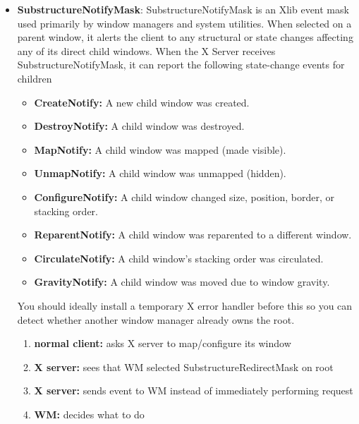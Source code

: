 \documentclass{report}
\begin{document}
\begin{itemize}
        \bigbreak \noindent 
        When this mask is set on a parent window (like the root window), it intercepts requests from other clients to map, configure (resize/move), or circulate child windows. Instead of executing the command, the X server pauses the action and sends the window manager a specific request even
    \item \textbf{SubstructureNotifyMask}: SubstructureNotifyMask is an Xlib event mask used primarily by window managers and system utilities. When selected on a parent window, it alerts the client to any structural or state changes affecting any of its direct child windows. 
        \bigbreak \noindent 
         When the X Server receives SubstructureNotifyMask, it can report the following state-change events for children
        \begin{itemize}
            \item \textbf{CreateNotify:} A new child window was created.
            \item \textbf{DestroyNotify:} A child window was destroyed.
            \item \textbf{MapNotify:} A child window was mapped (made visible).
            \item \textbf{UnmapNotify:} A child window was unmapped (hidden).
            \item \textbf{ConfigureNotify:} A child window changed size, position, border, or stacking order.
            \item \textbf{ReparentNotify:} A child window was reparented to a different window.
            \item \textbf{CirculateNotify:} A child window's stacking order was circulated.
            \item \textbf{GravityNotify:} A child window was moved due to window gravity. 
        \end{itemize}
        You should ideally install a temporary X error handler before this so you can detect whether another window manager already owns the root.
        \bigbreak \noindent 
        \begin{enumerate}
            \item \textbf{normal client:} asks X server to map/configure its window
            \item \textbf{X server:} sees that WM selected SubstructureRedirectMask on root
            \item \textbf{X server:} sends event to WM instead of immediately performing request
            \item \textbf{WM:} decides what to do

\end{enumerate}
\end{itemize}
\end{document}
